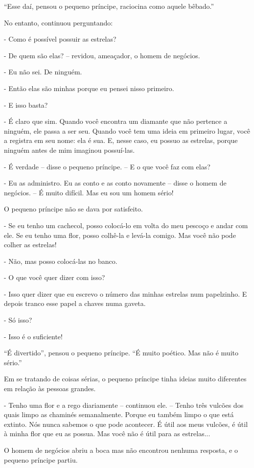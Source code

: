 ``Esse daí, pensou o pequeno príncipe, raciocina como aquele bêbado.''

No entanto, continuou perguntando:

- Como é possível possuir as estrelas?

- De quem são elas? -- revidou, ameaçador, o homem de negócios.

- Eu não sei. De ninguém.

- Então elas são minhas porque eu pensei nisso primeiro.

- E isso basta?

- É claro que sim. Quando você encontra um diamante que não pertence a
ninguém, ele passa a ser seu. Quando você tem uma ideia em primeiro
lugar, você a registra em seu nome: ela é sua. E, nesse caso, eu possuo
as estrelas, porque ninguém antes de mim imaginou possuí-las.

- É verdade -- disse o pequeno príncipe. -- E o que você faz com elas?

- Eu as administro. Eu as conto e as conto novamente -- disse o homem de
negócios. -- É muito difícil. Mas eu sou um homem sério!

O pequeno príncipe não se dava por satisfeito.

- Se eu tenho um cachecol, posso colocá-lo em volta do meu pescoço e
andar com ele. Se eu tenho uma flor, posso colhê-la e levá-la comigo.
Mas você não pode colher as estrelas!

- Não, mas posso colocá-las no banco.

- O que você quer dizer com isso?

- Isso quer dizer que eu escrevo o número das minhas estrelas num
papelzinho. E depois tranco esse papel a chaves numa gaveta.

- Só isso?

- Isso é o suficiente!

``É divertido'', pensou o pequeno príncipe. ``É muito poético. Mas não é
muito sério.''

Em se tratando de coisas sérias, o pequeno príncipe tinha ideias muito
diferentes em relação às pessoas grandes.

- Tenho uma flor e a rego diariamente -- continuou ele. -- Tenho três
vulcões dos quais limpo as chaminés semanalmente. Porque eu também limpo
o que está extinto. Nós nunca sabemos o que pode acontecer. É útil aos
meus vulcões, é útil à minha flor que eu as possua. Mas você não é útil
para as estrelas...

O homem de negócios abriu a boca mas não encontrou nenhuma resposta, e o
pequeno príncipe partiu.

